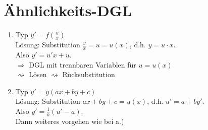 \documentclass{scrreprt}
\renewenvironment{anumerate}{\begin{enumerate}[label=(\alph*)]}{\end{enumerate}} %
\begin{document}
\section{Ähnlichkeits-DGL}
\begin{anumerate}
\item Typ $\boxed{y'=f\left(\frac{y}{x}\right)}$\\
Lösung: Substitution $\frac{y}{x}=u=u(x)$, d.h. $y=u\cdot x$.\\
Also $y'=u'x+u$.\\
$\Rightarrow $ DGL mit trennbaren Variablen für $u=u(x)$\\
$\rightsquigarrow$ Lösen $\rightsquigarrow$ Rücksubstitution
\item Typ $\boxed{y'=y(ax+by+c)}$\\
Lösung: Substitution $ax+by+c=u(x)$, d.h. $u'=a+by'$.\\
Also $y'=\frac{1}{b}(u'-a)$.\\
Dann weiteres vorgehen wie bei a.)
\end{anumerate}
\end{document}
